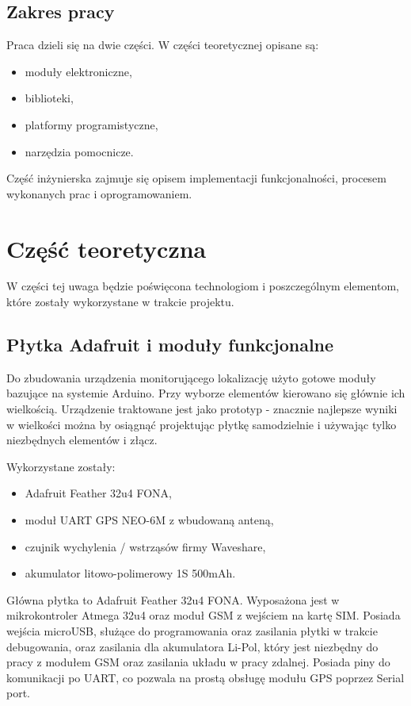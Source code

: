 \documentclass[eng,printmode]{mgr}
\begin{document}
\section{Zakres pracy}
Praca dzieli się na dwie części. W części teoretycznej opisane są:
\begin{itemize}
\item moduły elektroniczne,
\item biblioteki,
\item platformy programistyczne,
\item narzędzia pomocnicze.
\end{itemize}
Część inżynierska zajmuje się opisem implementacji funkcjonalności, procesem wykonanych prac i oprogramowaniem.

\chapter{Część teoretyczna}
W części tej uwaga będzie poświęcona technologiom i poszczególnym elementom, które zostały wykorzystane w trakcie projektu. 

\section{Płytka Adafruit i moduły funkcjonalne}
Do zbudowania urządzenia monitorującego lokalizację użyto gotowe moduły bazujące na systemie Arduino. Przy wyborze elementów kierowano się głównie ich wielkością. Urządzenie traktowane jest jako prototyp - znacznie najlepsze wyniki w wielkości można by osiągnąć projektując płytkę samodzielnie i używając tylko niezbędnych elementów i złącz.

Wykorzystane zostały:
\begin{itemize}
\item Adafruit Feather 32u4 FONA,
\item moduł UART GPS NEO-6M z wbudowaną anteną,
\item czujnik wychylenia / wstrząsów firmy Waveshare,
\item akumulator litowo-polimerowy 1S 500mAh.
\end{itemize}

Główna płytka to Adafruit Feather 32u4 FONA. Wyposażona jest w mikrokontroler Atmega 32u4 oraz moduł GSM z wejściem na kartę SIM. Posiada wejścia microUSB, służące do programowania oraz zasilania płytki w trakcie debugowania, oraz zasilania dla akumulatora Li-Pol, który jest niezbędny do pracy z modułem GSM oraz zasilania układu w pracy zdalnej. Posiada piny do komunikacji po UART, co pozwala na prostą obsługę modułu GPS poprzez Serial port.
\end{document}
